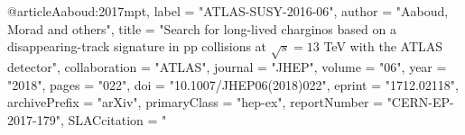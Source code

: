 @article{Aaboud:2017mpt,
      label          = "ATLAS-SUSY-2016-06",
      author         = "Aaboud, Morad and others",
      title          = "{Search for long-lived charginos based on a
                        disappearing-track signature in pp collisions at $
                        \sqrt{s}=13 $ TeV with the ATLAS detector}",
      collaboration  = "ATLAS",
      journal        = "JHEP",
      volume         = "06",
      year           = "2018",
      pages          = "022",
      doi            = "10.1007/JHEP06(2018)022",
      eprint         = "1712.02118",
      archivePrefix  = "arXiv",
      primaryClass   = "hep-ex",
      reportNumber   = "CERN-EP-2017-179",
      SLACcitation   = "%
}

